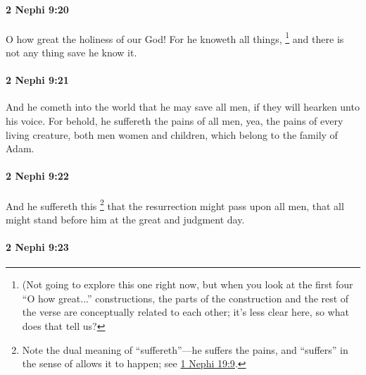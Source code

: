 		\paragraph{2 Nephi 9:20} %
			\label{2NEPHI-9-20}

			O how great the holiness of our God!
			For he knoweth all things,%
				\footnote{%
					\label{2NEPHI-9-20-knoweth}%
					(Not going to explore this one right now, but when you look at the first four ``O how great...'' constructions, the parts of the construction and the rest of the verse are conceptually related to each other; it's less clear here, so what does that tell us?
					}
			and there is not any thing save he know it.

		\paragraph{2 Nephi 9:21} %
			\label{2NEPHI-9-21}

			And he cometh into the world that he may save all men,
			if they will hearken unto his voice.
			For behold, he suffereth the pains of all men,
			yea, the pains of every living creature, both men women and children,
			which belong to the family of Adam.

		\paragraph{2 Nephi 9:22} %
			\label{2NEPHI-9-22}

			And he suffereth this%
				\footnote{%
					\label{2NEPHI-9-22-suffereth}%
					Note the dual meaning of ``suffereth''---he suffers the pains, and ``suffers'' in the sense of allows it to happen; see \hyperref[1NEPHI-19-9]{1 Nephi 19:9}.
					}
			that the resurrection might pass upon all men,
			that all might stand before him at the great and judgment day.

		\paragraph{2 Nephi 9:23} %
			\label{2NEPHI-9-23}

